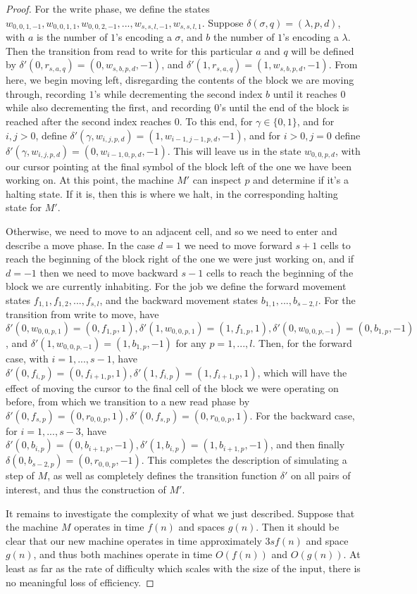 \documentclass{article}
\theoremstyle{definition}
\theoremstyle{plain}
\theoremstyle{theorem}
\begin{document}
\begin{proof}
	For the write phase, we define the states $w_{0,0,1,-1},w_{0,0,1,1},w_{0,0,2,-1},...,w_{s,s,l,-1},w_{s,s,l,1}$. Suppose $\delta(\sigma,q) = (\lambda,p,d)$, with $a$ is the number of $1$'s encoding a $\sigma$, and $b$ the number of $1$'s encoding a $\lambda$. Then the transition from read to write for this particular $a$ and $q$ will be defined by $\delta'(0,r_{s,a,q}) = (0,w_{s,b,p,d},-1)$, and $\delta'(1,r_{s,a,q}) = (1,w_{s,b,p,d},-1)$. From here, we begin moving left, disregarding the contents of the block we are moving through, recording $1$'s while decrementing the second index $b$ until it reaches $0$ while also decrementing the first, and recording $0$'s until the end of the block is reached after the second index reaches $0$. To this end, for $\gamma \in \{0,1\}$, and for $i,j>0$, define $\delta'(\gamma,w_{i,j,p,d}) = (1,w_{i-1,j-1,p,d},-1)$, and for $i>0,j=0$ define $\delta'(\gamma,w_{i,j,p,d}) = (0,w_{i-1,0,p,d},-1)$. This will leave us in the state $w_{0,0,p,d}$, with our cursor pointing at the final symbol of the block left of the one we have been working on. At this point, the machine $M'$ can inspect $p$ and determine if it's a halting state. If it is, then this is where we halt, in the corresponding halting state for $M'$. \par 
	Otherwise, we need to move to an adjacent cell, and so we need to enter and describe a move phase. In the case $d=1$ we need to move forward $s+1$ cells to reach the beginning of the block right of the one we were just working on, and if $d=-1$ then we need to move backward $s-1$ cells to reach the beginning of the block we are currently inhabiting. For the job we define the forward movement states $f_{1,1},f_{1,2},...,f_{s,l}$, and the backward movement states $b_{1,1},...,b_{s-2,l}$. For the transition from write to move, have $\delta'(0,w_{0,0,p,1}) = (0,f_{1,p},1),\delta'(1,w_{0,0,p,1}) = (1,f_{1,p},1), \delta'(0,w_{0,0,p,-1}) = (0,b_{1,p},-1)$, and $\delta'(1,w_{0,0,p,-1}) = (1,b_{1,p},-1)$ for any $p = 1,...,l$. Then, for the forward case, with $i=1,...,s-1$, have $\delta'(0,f_{i,p}) = (0,f_{i+1,p},1),\delta'(1,f_{i,p}) = (1,f_{i+1,p},1)$, which will have the effect of moving the cursor to the final cell of the block we were operating on before, from which we transition to a new read phase by $\delta'(0,f_{s,p}) = (0,r_{0,0,p},1),\delta'(0,f_{s,p}) = (0,r_{0,0,p},1)$. For the backward case, for $i=1,...,s-3$, have $\delta'(0,b_{i,p}) = (0,b_{i+1,p},-1),\delta'(1,b_{i,p}) = (1,b_{i+1,p},-1)$, and then finally $\delta(0,b_{s-2,p}) = (0,r_{0,0,p},-1)$. This completes the description of simulating a step of $M$, as well as completely defines the transition function $\delta'$ on all pairs of interest, and thus the construction of $M'$. \par 
	It remains to investigate the complexity of what we just described. Suppose that the machine $M$ operates in time $f(n)$ and spaces $g(n)$. Then it should be clear that our new machine operates in time approximately $3sf(n)$ and space $g(n)$, and thus both machines operate in time $O(f(n))$ and $O(g(n))$. At least as far as the rate of difficulty which scales with the size of the input, there is no meaningful loss of efficiency. 
\end{proof}
\end{document}
